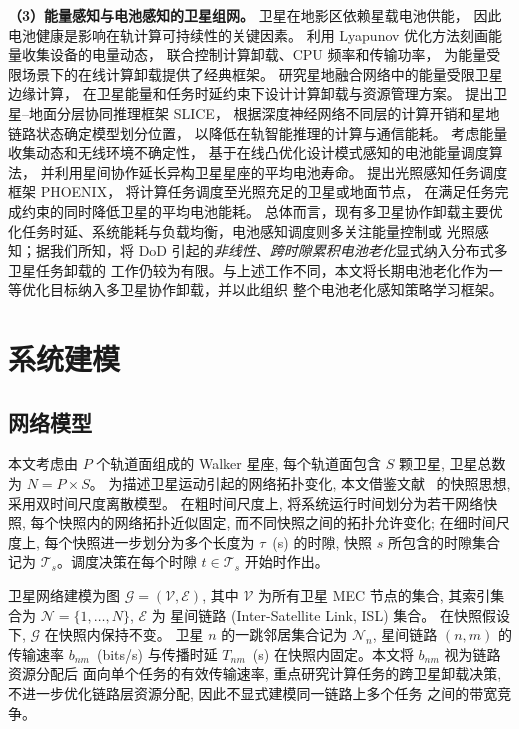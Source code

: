 \documentclass[a4paper,11pt]{article}
\begin{document}
\noindent\textbf{（3）能量感知与电池感知的卫星组网。}
卫星在地影区依赖星载电池供能，
因此电池健康是影响在轨计算可持续性的关键因素。
\cite{mao2016eh}利用 Lyapunov 优化方法刻画能量收集设备的电量动态，
联合控制计算卸载、CPU 频率和传输功率，
为能量受限场景下的在线计算卸载提供了经典框架。
\cite{energyconstrained}研究星地融合网络中的能量受限卫星边缘计算，
在卫星能量和任务时延约束下设计计算卸载与资源管理方案。
\cite{chen2025slice}提出卫星--地面分层协同推理框架 SLICE，
根据深度神经网络不同层的计算开销和星地链路状态确定模型划分位置，
以降低在轨智能推理的计算与通信能耗。
\cite{li2024battery}考虑能量收集动态和无线环境不确定性，
基于在线凸优化设计模式感知的电池能量调度算法，
并利用星间协作延长异构卫星星座的平均电池寿命。
\cite{liu2024phoenix}提出光照感知任务调度框架 PHOENIX，
将计算任务调度至光照充足的卫星或地面节点，
在满足任务完成约束的同时降低卫星的平均电池能耗。
总体而言，现有多卫星协作卸载主要优化任务时延、系统能耗与负载均衡，电池感知调度则多关注能量控制或
光照感知；据我们所知，将 DoD 引起的\emph{非线性、跨时隙累积电池老化}显式纳入分布式多卫星任务卸载的
工作仍较为有限。与上述工作不同，本文将长期电池老化作为一等优化目标纳入多卫星协作卸载，并以此组织
整个电池老化感知策略学习框架。
\section{系统建模}
\label{sec:system_model}

\subsection{网络模型}
\label{subsec:network_model}

本文考虑由 $P$ 个轨道面组成的 Walker 星座, 每个轨道面包含
$S$ 颗卫星, 卫星总数为 $N = P \times S$。
为描述卫星运动引起的网络拓扑变化, 本文借鉴文献~\cite{zhang2024mhspo}
的快照思想, 采用双时间尺度离散模型。
在粗时间尺度上, 将系统运行时间划分为若干网络快照,
每个快照内的网络拓扑近似固定, 而不同快照之间的拓扑允许变化;
在细时间尺度上, 每个快照进一步划分为多个长度为
$\tau$~(s) 的时隙, 快照 $s$ 所包含的时隙集合记为
$\mathcal{T}_s$。调度决策在每个时隙
$t \in \mathcal{T}_s$ 开始时作出。

卫星网络建模为图 $\mathcal{G} = (\mathcal{V}, \mathcal{E})$,
其中 $\mathcal{V}$ 为所有卫星 MEC 节点的集合, 其索引集合为
$\mathcal{N} = \{1, \ldots, N\}$, $\mathcal{E}$ 为
星间链路 (Inter-Satellite Link, ISL) 集合。
在快照假设下, $\mathcal{G}$ 在快照内保持不变。
卫星 $n$ 的一跳邻居集合记为 $\mathcal{N}_n$,
星间链路 $(n, m)$ 的传输速率 $b_{nm}$~(bits/s) 与传播时延
$T_{nm}$~(s) 在快照内固定。本文将 $b_{nm}$ 视为链路资源分配后
面向单个任务的有效传输速率, 重点研究计算任务的跨卫星卸载决策,
不进一步优化链路层资源分配, 因此不显式建模同一链路上多个任务
之间的带宽竞争。
\end{document}

